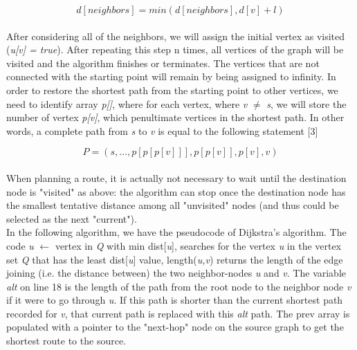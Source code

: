 \documentclass{article}
\begin{document}
\begin{equation}
    d [ neighbors ] = min ( d [ neighbors ] ,  d[ v ]  +  l )       
\end{equation}
\\
After considering all of the neighbors, we will assign the initial vertex as visited (\textit{u[v] = true}). After repeating this step n times, all vertices of the graph will be visited and the algorithm finishes or terminates. The vertices that are not connected with the starting point will remain by being assigned to infinity. In order to restore the shortest path from  the starting point to other vertices, we  need to identify array \textit{p[]}, where for each vertex, where \textit{v} $\neq$ \textit{s}, we will store the number of vertex \textit{p[v]}, which penultimate vertices in the  shortest  path. In other words, a complete path from \textit{s} to \textit{v} is equal to the following statement [3]

\begin{equation}
   P = ( s , … , p [ p [ p [ v ] ] ] , p [ p [ v ] ] , p [ v ] , v )      
\end{equation}
\\
When planning a route, it is actually not necessary to wait until the destination node is "visited" as above: the algorithm can stop once the destination node has the smallest tentative distance among all "unvisited" nodes (and thus could be selected as the next "current").
\vspace{5pt}
\\
In the following algorithm, we have the pseudocode of Dijkstra’s algorithm. The code \textit{u} $\leftarrow$ vertex in \textit{Q} with min dist[\textit{u}], searches for the vertex \textit{u} in the vertex set \textit{Q} that has the least dist[\textit{u}] value, length(\textit{u,v}) returns the length of the edge joining (i.e. the distance between) the two neighbor-nodes \textit{u} and \textit{v}. The variable \textit{alt} on line 18 is the length of the path from the root node to the neighbor node \textit{v} if it were to go through \textit{u}. If this path is shorter than the current shortest path recorded for \textit{v}, that current path is replaced with this \textit{alt} path. The prev array is populated with a pointer to the "next-hop" node on the source graph to get the shortest route to the source.
\vspace{5pt}
\\
\end{document}
